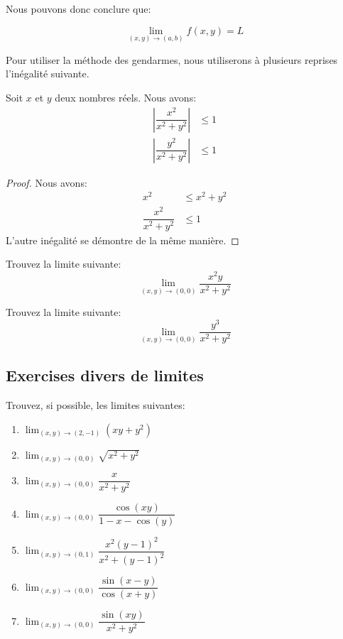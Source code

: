\documentclass[]{book}
\providecommand{\tightlist}{%
  \setlength{\itemsep}{0pt}\setlength{\parskip}{0pt}}
\theoremstyle{definition}
\theoremstyle{definition}
\theoremstyle{definition}
\theoremstyle{remark}
\let\BeginKnitrBlock\begin \let\EndKnitrBlock\end
\begin{document}
Nous pouvons donc conclure que:

\[ \lim_{(x,y)\to (a,b)}f(x,y)=L \]

Pour utiliser la méthode des gendarmes, nous utiliserons à plusieurs
reprises l'inégalité suivante.

\BeginKnitrBlock{proposition}
\protect\hypertarget{prp:unnamed-chunk-142}{}{\label{prp:unnamed-chunk-142}
}Soit \(x\) et \(y\) deux nombres réels. Nous avons: \begin{align*}
\left|\dfrac{x^2}{x^2+y^2}\right| &\leq 1 \\
\left|\dfrac{y^2}{x^2+y^2}\right| &\leq 1
\end{align*}
\EndKnitrBlock{proposition}

\BeginKnitrBlock{proof}
{}Nous avons: \begin{align*}
x^2 &\leq x^2+y^2 \\
\dfrac{x^2}{x^2+y^2} &\leq 1
\end{align*} L'autre inégalité se démontre de la même manière.
\EndKnitrBlock{proof}

\BeginKnitrBlock{example}
\protect\hypertarget{exm:unnamed-chunk-144}{}{\label{exm:unnamed-chunk-144}
}Trouvez la limite suivante:
\[ \lim_{(x,y)\to (0,0)}\dfrac{x^2y}{x^2+y^2} \]
\EndKnitrBlock{example}

\BeginKnitrBlock{example}
\protect\hypertarget{exm:unnamed-chunk-145}{}{\label{exm:unnamed-chunk-145}
}Trouvez la limite suivante:
\[ \lim_{(x,y)\to (0,0)}\dfrac{y^3}{x^2+y^2} \]
\EndKnitrBlock{example}

\hypertarget{exercises-divers-de-limites}{%
\subsection{Exercises divers de
limites}\label{exercises-divers-de-limites}}

\BeginKnitrBlock{example}
\protect\hypertarget{exm:unnamed-chunk-146}{}{\label{exm:unnamed-chunk-146}
}Trouvez, si possible, les limites suivantes:

\begin{enumerate}
\def\labelenumi{\alph{enumi}.}
\tightlist
\item
  \(\lim_{(x,y)\to (2,-1)} (xy+y^2)\)
\item
  \(\lim_{(x,y)\to (0,0)} \sqrt{x^2+y^2}\)
\item
  \(\lim_{(x,y)\to (0,0)} \dfrac{x}{x^2+y^2}\)
\item
  \(\lim_{(x,y)\to (0,0)} \dfrac{\cos(xy)}{1-x-\cos(y)}\)
\item
  \(\lim_{(x,y)\to (0,1)} \dfrac{x^2(y-1)^2}{x^2+(y-1)^2}\)
\item
  \(\lim_{(x,y)\to (0,0)} \dfrac{\sin(x-y)}{\cos(x+y)}\)
\item
  \(\lim_{(x,y)\to (0,0)} \dfrac{\sin(xy)}{x^2+y^2}\)
\end{enumerate}
\EndKnitrBlock{example}
\end{document}
